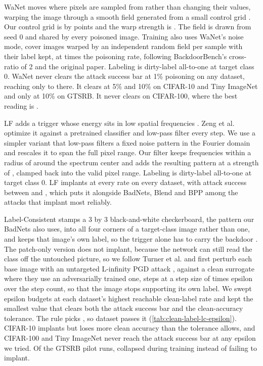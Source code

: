 WaNet moves where pixels are sampled from rather than changing their values, warping the image through a smooth field generated from a small control grid \cite{nguyen2021wanet}. Our control grid is \AttackWanetControlGridSize{} by \AttackWanetControlGridSize{} points and the warp strength is \AttackWanetStrength{}. The field is drawn from seed 0 and shared by every poisoned image. Training also uses WaNet's noise mode, cover images warped by an independent random field per sample with their label kept, at \AttackWanetCoverRatio{} times the poisoning rate, following BackdoorBench's cross-ratio of 2 and the original paper. Labeling is dirty-label all-to-one at target class 0. WaNet never clears the attack success bar at 1\% poisoning on any dataset, reaching only \AttackWanetAsrLowRateMin{} to \AttackWanetAsrLowRateMax{} there. It clears at 5\% and 10\% on CIFAR-10 and Tiny ImageNet and only at 10\% on GTSRB. It never clears on CIFAR-100, where the best reading is \AttackWanetAsrNeverClearingMax{}.

LF adds a trigger whose energy sits in low spatial frequencies \cite{zeng2021lf}. Zeng et al. optimize it against a pretrained classifier and low-pass filter every step. We use a simpler variant that low-pass filters a fixed noise pattern in the Fourier domain and rescales it to span the full pixel range. Our filter keeps frequencies within a radius of \AttackLfCutoff{} around the spectrum center and adds the resulting pattern at a strength of \AttackLfStrength{}, clamped back into the valid pixel range. Labeling is dirty-label all-to-one at target class 0. LF implants at every rate on every dataset, with attack success between \AttackLfAsrMin{} and \AttackLfAsrMax{}, which puts it alongside BadNets, Blend and BPP among the attacks that implant most reliably.

Label-Consistent stamps a 3 by 3 black-and-white checkerboard, the pattern our BadNets also uses, into all four corners of a target-class image rather than one, and keeps that image's own label, so the trigger alone has to carry the backdoor \cite{turner2019label}. The patch-only version does not implant, because the network can still read the class off the untouched picture, so we follow Turner et al. and first perturb each base image with an untargeted L-infinity PGD attack \cite{madry2018pgd}, against a clean surrogate where they use an adversarially trained one, \AttackLcPgdSteps{} steps at a step size of \AttackLcPgdStepFactor{} times epsilon over the step count, so that the image stops supporting its own label. We swept \LcEpsilonBudgets{} epsilon budgets at each dataset's highest reachable clean-label rate and kept the smallest value that clears both the attack success bar and the clean-accuracy tolerance. The rule picks \LcEpsilonChosen{}, so \LcDatasetsWithEpsilon{} dataset passes it (\cref{tab:clean-label-lc-epsilon}). CIFAR-10 implants but loses more clean accuracy than the tolerance allows, and CIFAR-100 and Tiny ImageNet never reach the attack success bar at any epsilon we tried. Of the \LcGtsrbPilotRuns{} GTSRB pilot runs, \LcGtsrbPilotDiverged{} collapsed during training instead of failing to implant.

